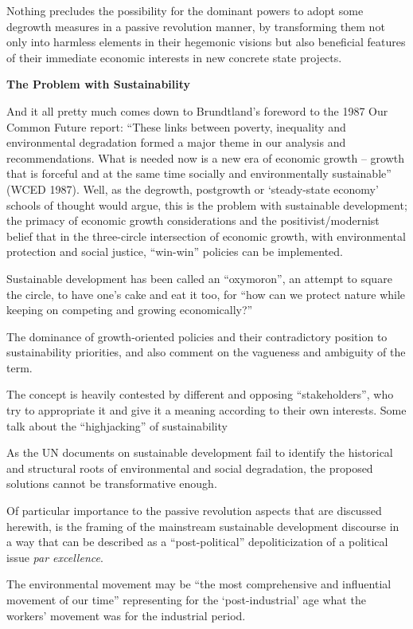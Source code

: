 \documentclass[
]{book}
\begin{document}
Nothing precludes the possibility for the dominant powers to adopt some degrowth
measures in a passive revolution manner, by transforming them not only into
harmless elements in their hegemonic visions but also beneficial features
of their immediate economic interests in new concrete state projects.

\textbf{The Problem with Sustainability}

And it all pretty much comes down to Brundtland's
foreword to the 1987 Our Common Future report: ``These links between poverty, inequality and environmental
degradation formed a major theme in our analysis and recommendations. What is needed now is a new era of
economic growth -- growth that is forceful and at the same time socially and environmentally sustainable''
(WCED 1987).
Well, as the degrowth, postgrowth or `steady-state economy' schools of thought would argue, this is the
problem with sustainable development; the primacy of economic growth considerations and the
positivist/modernist belief that in the three-circle intersection of economic growth, with environmental
protection and social justice, ``win-win'' policies can be implemented.

Sustainable development has been called
an ``oxymoron'', an attempt to square the circle, to have one's cake and eat it too, for ``how can we protect nature
while keeping on competing and growing economically?''

The dominance
of growth-oriented policies and their contradictory position to sustainability priorities, and also comment on
the vagueness and ambiguity of the term.

The concept is heavily
contested by different and opposing ``stakeholders'', who try to appropriate it and give it a meaning according
to their own interests. Some talk about the ``highjacking'' of sustainability

As the UN documents on sustainable development
fail to identify the historical and structural roots of environmental and social degradation, the proposed solutions
cannot be transformative enough.

Of particular importance to the passive revolution aspects that are discussed herewith, is the framing of
the mainstream sustainable development discourse in a way that can be described as a ``post-political''
depoliticization of a political issue \emph{par excellence}.

The environmental movement may be ``the most comprehensive and influential
movement of our time'' representing for the `post-industrial' age what the workers'
movement was for the industrial period.
\end{document}
